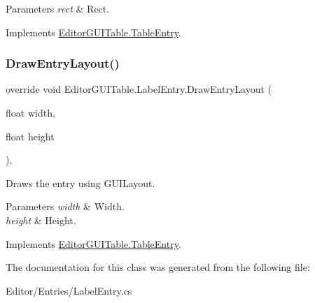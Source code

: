 \begin{DoxyParams}{Parameters}
{\em rect} & Rect.\\
\hline
\end{DoxyParams}


Implements \mbox{\hyperlink{class_editor_g_u_i_table_1_1_table_entry_ae02e641122da6dd161d61a20576812ca}{Editor\+G\+U\+I\+Table.\+Table\+Entry}}.

\mbox{\label{class_editor_g_u_i_table_1_1_label_entry_a1bf901bb1f193f4c7ff842d898968572}} 
\subsubsection{\texorpdfstring{Draw\+Entry\+Layout()}{DrawEntryLayout()}}
{\footnotesize\ttfamily override void Editor\+G\+U\+I\+Table.\+Label\+Entry.\+Draw\+Entry\+Layout (\begin{DoxyParamCaption}\item[{float}]{width,  }\item[{float}]{height }\end{DoxyParamCaption})\hspace{0.3cm}{\ttfamily [inline]}, {\ttfamily [virtual]}}



Draws the entry using G\+U\+I\+Layout. 


\begin{DoxyParams}{Parameters}
{\em width} & Width.\\
\hline
{\em height} & Height.\\
\hline
\end{DoxyParams}


Implements \mbox{\hyperlink{class_editor_g_u_i_table_1_1_table_entry_abe1e2747e56d50731eeec28635b366a1}{Editor\+G\+U\+I\+Table.\+Table\+Entry}}.



The documentation for this class was generated from the following file\+:\begin{DoxyCompactItemize}
\item 
Editor/\+Entries/Label\+Entry.\+cs\end{DoxyCompactItemize}
